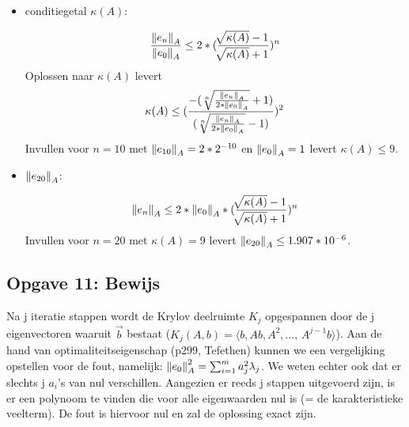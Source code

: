 \documentclass[a4paper]{article}
\newcommand{\opgave}[1]{\subsection{Opgave #1}}
\begin{document}
\begin{itemize}
    	\item conditiegetal \(\kappa(A)\): \par\noindent
        \[\frac{\norm{e_n}_A}{\norm{e_0}_A} \leq 2*(\frac{\sqrt[]{\kappa(A)}-1}{\sqrt[]					{\kappa(A)}+1})^n\]
        Oplossen naar \(\kappa(A)\) levert
        \[\kappa(A) \leq (\frac{-(\sqrt[n]{\frac{\norm{e_n}_A}{2*\norm{e_0}_A}}+1)}						{(\sqrt[n]{\frac{\norm{e_n}_A}{2*\norm{e_0}_A}}-1)})^2\]
        Invullen voor \(n = 10\) met \(\norm{e_{10}}_A = 2*2^{-10}\) en \(\norm{e_0}_A = 1\) 			levert \(\kappa(A) \leq 9\).
        
        \item \(\norm{e_{20}}_A\): \par\noindent
        \[\norm{e_n}_A \leq 2*\norm{e_0}_A*(\frac{\sqrt[]{\kappa(A)}-1}{\sqrt[]							{\kappa(A)}+1})^n\]
        Invullen voor \(n = 20\) met \(\kappa(A) = 9\) levert \(\norm{e_{20}}_A \leq 					1.907*10^{-6}\).
	\end{itemize}
\newpage
\opgave{11: Bewijs}\label{sec:oef11}
Na j iteratie stappen wordt de Krylov deelruimte $K_j$ opgespannen door de j eigenvectoren waaruit $\vec{b}$ bestaat ($K_j(A,b) = \langle b, Ab, A^2,\text{..., }A^{j-1}b \rangle $). Aan de hand van optimaliteitseigenschap (p299, Tefethen) kunnen we een vergelijking opstellen voor de fout, namelijk: $\norm{e_0}_A^2 = \sum_{i=1}^m a_j^2 \lambda_j$. We weten echter ook dat er slechts j $a_i$'s van nul verschillen. Aangezien er reeds j stappen uitgevoerd zijn, is er een polynoom te vinden die voor alle eigenwaarden nul is (= de karakteristieke veelterm). De fout is hiervoor nul en zal de oplossing exact zijn.
\end{document}

